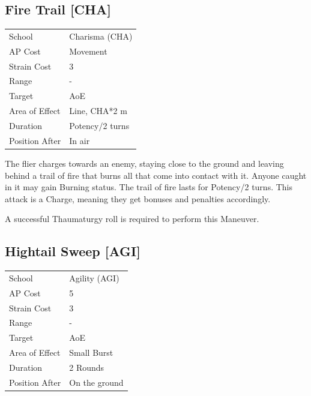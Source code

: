 \documentclass[11pt,a4paper,twocolumn]{book}
\begin{document}
\subsection*{Fire Trail [CHA]}
{
	\begin{tabu} to 75mm{| X[l,4] | X[l,7] |}
		\hline
		School 			& Charisma (CHA) 	\\
        AP Cost	      	& Movement	 		\\
        Strain Cost     & 3 				\\
        Range     		& - 				\\
        Target      	& AoE 				\\
        Area of Effect  & Line, CHA*2 m 	\\
        Duration     	& Potency/2 turns 	\\
		Position After  & In air 			\\ \hline
	\end{tabu}
		
}

\medskip

The flier charges towards an enemy, staying close to the ground and leaving behind a trail of fire that burns all that come into contact with it. Anyone caught in it may gain Burning status. The trail of fire lasts for Potency/2 turns. This attack is a Charge, meaning they get bonuses and penalties accordingly.

A successful Thaumaturgy roll is required to perform this Maneuver.


\subsection*{Hightail Sweep [AGI]}
{
	\begin{tabu} to 75mm{| X[l,4] | X[l,7] |}
		\hline
		School 			& Agility (AGI) 	\\
        AP Cost	      	& 5 				\\
        Strain Cost     & 3 				\\
        Range     		& - 				\\
        Target      	& AoE 				\\
        Area of Effect  & Small Burst 	 	\\
        Duration     	& 2 Rounds 	 			\\
		Position After  & On the ground 	\\ \hline
	\end{tabu}
		
}
\end{document}
